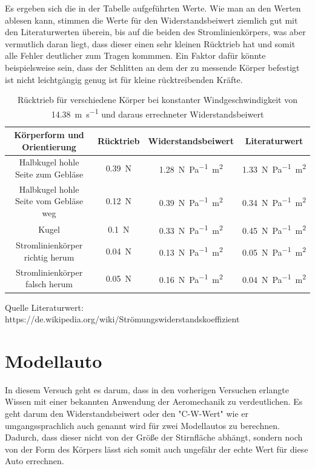 Es ergeben sich die in der Tabelle aufgeführten Werte. Wie man an den Werten ablesen kann, stimmen die Werte für den Widerstandsbeiwert ziemlich gut mit den Literaturwerten überein, bis auf die beiden des Stromlinienkörpers, was aber vermutlich daran liegt, dass dieser einen sehr kleinen Rücktrieb hat und somit alle Fehler deutlicher zum Tragen kommmen. Ein Faktor dafür könnte beispielsweise sein, dass der Schlitten an dem der zu messende Körper befestigt ist nicht leichtgängig genug ist für kleine rücktreibenden Kräfte.

\begin{table}[]
    \caption{Rücktrieb für verschiedene Körper bei konstanter Windgeschwindigkeit von  \SI{14.38}{\metre\per\second} und daraus errechneter Widerstandsbeiwert}
    \centering
    \begin{tabular}{c c c c}
    \hline
    Körperform und Orientierung & Rücktrieb & Widerstandsbeiwert & Literaturwert\\
    \hline
    Halbkugel hohle Seite zum Gebläse   &   \SI{0.39}{\newton} & \SI{1.28}{\newton\per\pascal\square\metre} & \SI{1.33}{\newton\per\pascal\square\metre}  \\[5pt]
    Halbkugel hohle Seite vom Gebläse weg   &   \SI{0.12}{\newton} & \SI{0.39}{\newton\per\pascal\square\metre} &\SI{0.34}{\newton\per\pascal\square\metre}\\[5pt]
    Kugel & \SI{0.1}{\newton} & \SI{0.33}{\newton\per\pascal\square\metre} &\SI{0.45}{\newton\per\pascal\square\metre}\\[5pt]
    Stromlinienkörper richtig herum & \SI{0.04}{\newton} & \SI{0.13}{\newton\per\pascal\square\metre} & \SI{0.05}{\newton\per\pascal\square\metre}\\[5pt]
    Stromlinienkörper falsch herum & \SI{0.05}{\newton} & \SI{0.16}{\newton\per\pascal\square\metre} & \SI{0.04}{\newton\per\pascal\square\metre}\\[5pt]
    \hline
    \end{tabular}
    \label{tab:Versuch 2.3}
    Quelle Literaturwert: https://de.wikipedia.org/wiki/Strömungswiderstandskoeffizient
\end{table}

\section{Modellauto}

In diesem Versuch geht es darum, dass in den vorherigen Versuchen erlangte Wissen mit einer bekannten Anwendung der Aeromechanik zu verdeutlichen. Es geht darum den Widerstandsbeiwert oder den "C-W-Wert"  wie er umgangssprachlich auch genannt wird für zwei Modellautos zu berechnen. Dadurch, dass dieser nicht von der Größe der Stirnfläche abhängt, sondern noch von der Form des Körpers lässt sich somit auch ungefähr der echte Wert für diese Auto errechnen. 

